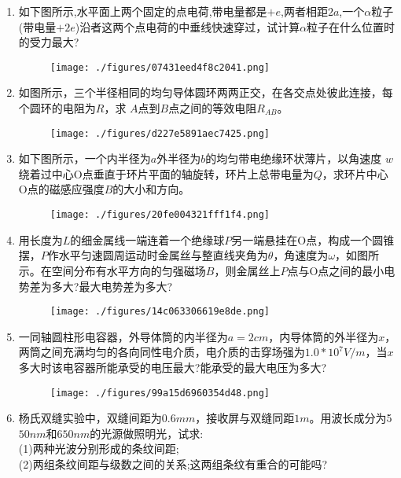 \begin{enumerate}
\item 如下图所示,水平面上两个固定的点电荷,带电量都是$+e$,两者相距$ 2a$,一个$\alpha $粒子(带电量$+2e$)沿者这两个点电荷的中垂线快速穿过，试计算$\alpha$粒子在什么位置时的受力最大?
\begin{figure}[ht]
\centering
\texttt{[image: ./figures/07431eed4f8c2041.png]}
\caption{} \label{fig_SD12_1}
\end{figure}
\item 如图所示，三个半径相同的均匀导体圆环两两正交，在各交点处彼此连接，每个圆环的电阻为$R$，求 $A$点到$B$点之间的等效电阻$R_{AB}$。
\begin{figure}[ht]
\centering
\texttt{[image: ./figures/d227e5891aec7425.png]}
\caption{} \label{fig_SD12_2}
\end{figure}
\item 如下图所示，一个内半径为$ a$外半径为$b$的均匀带电绝缘环状薄片，以角速度 $w $绕着过中心O点垂直于环片平面的轴旋转，环片上总带电量为$Q$，求环片中心O点的磁感应强度$B$的大小和方向。
\begin{figure}[ht]
\centering
\texttt{[image: ./figures/20fe004321fff1f4.png]}
\caption{} \label{fig_SD12_3}
\end{figure}
\item 用长度为$L$的细金属线一端连着一个绝缘球$P$另一端悬挂在O点，构成一个圆锥摆，$P$作水平匀速圆周运动时金属丝与整直线夹角为$\theta$，角速度为$\omega$，如图所示。在空间分布有水平方向的匀强磁场$B$，则金属丝上$P$点与O点之间的最小电势差为多大?最大电势差为多大?
\begin{figure}[ht]
\centering
\texttt{[image: ./figures/14c063306619e8de.png]}
\caption{} \label{fig_SD12_4}
\end{figure}
\item 一同轴圆柱形电容器，外导体筒的内半径为$a=2cm$，内导体筒的外半径为$x$，两筒之间充满均匀的各向同性电介质，电介质的击穿场强为$1.0*10^7 V/m$，当$x$多大时该电容器所能承受的电压最大?能承受的最大电压为多大?
\begin{figure}[ht]
\centering
\texttt{[image: ./figures/99a15d6960354d48.png]}
\caption{} \label{fig_SD12_5}
\end{figure}
\item 杨氏双缝实验中，双缝间距为$0.6mm$，接收屏与双缝同距$1m$。用波长成分为5$50nm$和$650nm$的光源做照明光，试求:\\
(1)两种光波分别形成的条纹间距;\\
(2)两组条纹间距与级数之间的关系;这两组条纹有重合的可能吗?

\end{enumerate}
